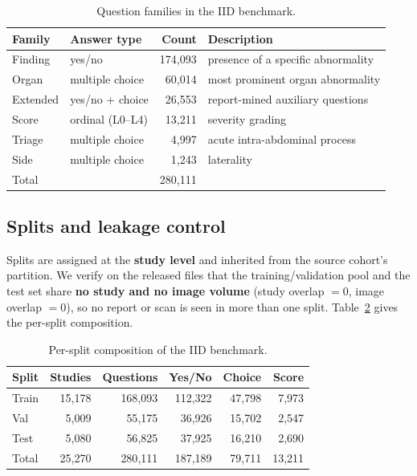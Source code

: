 \begin{table}[t]
\centering
\caption{Question families in the IID benchmark.}
\label{tab:families}
\begin{tabular}{llrl}
\toprule
Family & Answer type & Count & Description \\
\midrule
Finding   & yes/no        & 174{,}093 & presence of a specific abnormality \\
Organ     & multiple choice & 60{,}014 & most prominent organ abnormality \\
Extended  & yes/no + choice & 26{,}553 & report-mined auxiliary questions \\
Score     & ordinal (L0--L4) & 13{,}211 & severity grading \\
Triage    & multiple choice & 4{,}997 & acute intra-abdominal process \\
Side      & multiple choice & 1{,}243 & laterality \\
\midrule
Total     &               & 280{,}111 & \\
\bottomrule
\end{tabular}
\end{table}

\subsection{Splits and leakage control}
\label{sec:splits}
Splits are assigned at the \textbf{study level} and inherited from the source
cohort's partition. We verify on the released files that the training/validation
pool and the test set share \textbf{no study and no image volume} (study overlap
$=0$, image overlap $=0$), so no report or scan is seen in more than one split.
Table~\ref{tab:splits} gives the per-split composition.

\begin{table}[t]
\centering
\caption{Per-split composition of the IID benchmark.}
\label{tab:splits}
\begin{tabular}{lrrrrr}
\toprule
Split & Studies & Questions & Yes/No & Choice & Score \\
\midrule
Train & 15{,}178 & 168{,}093 & 112{,}322 & 47{,}798 & 7{,}973 \\
Val   & 5{,}009  & 55{,}175  & 36{,}926  & 15{,}702 & 2{,}547 \\
Test  & 5{,}080  & 56{,}825  & 37{,}925  & 16{,}210 & 2{,}690 \\
\midrule
Total & 25{,}270 & 280{,}111 & 187{,}189 & 79{,}711 & 13{,}211 \\
\bottomrule
\end{tabular}
\end{table}

